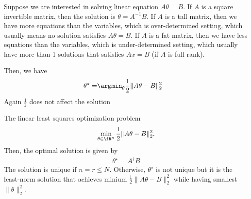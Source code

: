 \documentclass{article}
\begin{document}
\begin{remark}
    Suppose we are interested in solving linear equation $A\theta = B$. 
    If $A$ is a square invertible matrix, then the solution is $\theta = A^{-1} B$.
    If $A$ is a tall matrix, then we have more equations than the variables, which is over-determined setting,
    which usually means no solution satisfies $A\theta=B$.
    If $A$ is a fat matrix, then we have less equations than the variables, which is under-determined setting,
    which usually have more than 1 solutions that satisfies $Ax=B$ (if $A$ is full rank).
\end{remark}

Then, we have
\begin{align}
    \theta^\star 
    =& \argmin_\theta \frac{1}{2} \|A\theta - B\|_2^2
\end{align}
Again $\frac{1}{2}$ does not affect the solution

\begin{theorem}
    The linear least squares optimization problem
    \begin{align}
        \min_{\theta\in\fR^n} \frac{1}{2}\|A\theta - B\|_2^2.
    \end{align}
    Then, the optimal solution is given by
    \begin{align}
        \theta^\star = A^\dagger B
    \end{align}
    The solution is unique if $n = r\leq N$.
    Otherwise, $\theta^\star$ is not unique but it is the least-norm solution
    that achieves minium $\frac{1}{2}\|A\theta-B\|_2^2$ while having smallest $\|\theta\|_2^2$.
\end{theorem}
\end{document}
